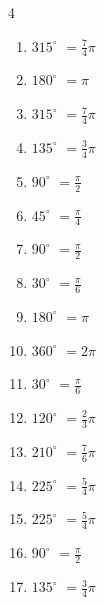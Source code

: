 \begin{multicols}{4}
\begin{enumerate}
  \item $\displaystyle 315^{\circ}$
        $\displaystyle =\frac{7}{4}\pi$

  \item $\displaystyle 180^{\circ}$
        $\displaystyle =\pi$

\columnbreak %

  \item $\displaystyle 315^{\circ}$
        $\displaystyle =\frac{7}{4}\pi$

  \item $\displaystyle 135^{\circ}$
        $\displaystyle =\frac{3}{4}\pi$

  \item $\displaystyle 90^{\circ}$
        $\displaystyle =\frac{\pi}{2}$

  \item $\displaystyle 45^{\circ}$
        $\displaystyle =\frac{\pi}{4}$

  \item $\displaystyle 90^{\circ}$
        $\displaystyle =\frac{\pi}{2}$

  \item $\displaystyle 30^{\circ}$
        $\displaystyle =\frac{\pi}{6}$

  \item $\displaystyle 180^{\circ}$
        $\displaystyle =\pi$

  \item $\displaystyle 360^{\circ}$
        $\displaystyle =2\pi$

  \item $\displaystyle 30^{\circ}$
        $\displaystyle =\frac{\pi}{6}$

  \item $\displaystyle 120^{\circ}$
        $\displaystyle =\frac{2}{3}\pi$

  \item $\displaystyle 210^{\circ}$
        $\displaystyle =\frac{7}{6}\pi$

  \item $\displaystyle 225^{\circ}$
        $\displaystyle =\frac{5}{4}\pi$

  \item $\displaystyle 225^{\circ}$
        $\displaystyle =\frac{5}{4}\pi$

  \item $\displaystyle 90^{\circ}$
        $\displaystyle =\frac{\pi}{2}$

  \item $\displaystyle 135^{\circ}$
        $\displaystyle =\frac{3}{4}\pi$


\end{enumerate}
\end{multicols}
